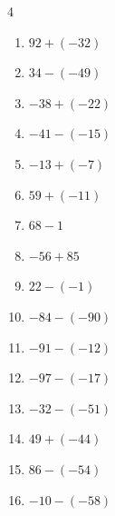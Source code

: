 \begin{multicols}{4}
\begin{enumerate}
  \item $92+(-32)$

        \phantom{$=60$}

  \item $34-(-49)$

        \phantom{$=83$}

  \item $-38+(-22)$

        \phantom{$=-60$}

  \item $-41-(-15)$

        \phantom{$=-26$}

  \item $-13+(-7)$

        \phantom{$=-20$}

  \item $59+(-11)$

        \phantom{$=48$}

  \item $68-1$

        \phantom{$=67$}

  \item $-56+85$

        \phantom{$=29$}

  \item $22-(-1)$

        \phantom{$=23$}

  \item $-84-(-90)$

        \phantom{$=6$}

  \item $-91-(-12)$

        \phantom{$=-79$}

  \item $-97-(-17)$

        \phantom{$=-80$}

  \item $-32-(-51)$

        \phantom{$=19$}

  \item $49+(-44)$

        \phantom{$=5$}

  \item $86-(-54)$

        \phantom{$=140$}

  \item $-10-(-58)$

        \phantom{$=48$}


\end{enumerate}
\end{multicols}
